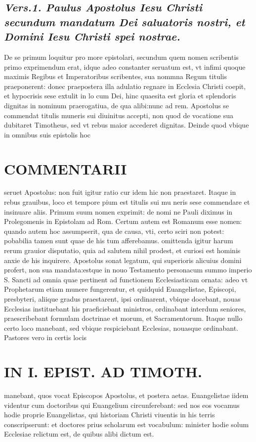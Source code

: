 \documentclass{article}
\begin{document}
\begin{pages}
\subsection*{\textit{Vers.1. Paulus Apostolus Iesu Christi secundum mandatum Dei saluatoris nostri, et Domini Iesu Christi spei nostrae. }}\pstart De se primum loquitur pro more epistolari, secundum quem nomen scribentis primo exprimendum erat, idque adeo constanter seruatum est, vt infimi quoque maximis Regibus et Imperatoribus scribentes, sua nommna Regum titulis praeponerent: donec praepostera illa adulatio regnare in Ecclesia Christi coepit, et hypocrisis sese extulit in lo cum Dei, hinc quaesita est gloria et splendoris dignitas in nominum praerogatiua, de qua alibi:nunc ad rem. Apostolus se commendat titulis muneris sui diuinitus accepti, non quod de vocatione sua dubitaret Timotheus, sed vt rebus maior accederet dignitas. Deinde quod vbique in omnibus suis epistolis hoc  \pend
\section*{COMMENTARII }
\marginpar{[ p.10 ]}\pstart seruet Apostolus: non fuit igitur ratio cur idem hic non praestaret. Itaque in rebus grauibus, loco et tempore pium est titulis sui mu neris sese commendare et insinuare aliis.  \pend\pstart Primum suum nomen exprimit: de nomi ne Pauli diximus in Prolegomenis in Epistolam ad Rom. Certum autem est Romanum esse nomen: quando autem hoc assumpserit, qua de causa, vti, certo sciri non potest: pobabilia tamen sunt quae de his tum afferebamus. omittenda igitur harum rerum grauior disputatio, quia ad salutem nihil prodest, et curiosi est hominis anxie de his inquirere.  \pend\pstart Apostolus sonat legatum, qui superioris alicuius domini profert, non sua mandata:estque in nouo Testamento personacum summo imperio S. Sancti ad omnia quae pertinent ad functionem Ecclesiasticam ornata: adeo vt Prophetarum etiam munere fungerentur, et quidquid Euangelistae, Episcopi, presbyteri, aliique gradus praestarent, ipsi ordinarent, vbique docebant, nouas Ecclesias instituebant his praeficiebant ministros, ordinabant interdum seniores, praescribebant formulam doctrinae et morum, et Sacramentorum. Itaque nullo certo loco manebant, sed vbique respiciebant Ecclesias, nouasque ordinabant. Pastores vero in certis locis  \pend
\section*{IN I. EPIST. AD TIMOTH. }
\marginpar{[ p.11 ]}\pstart manebant, quos vocat Episcopos Apostolus, et postera aetas. Euangelistae iidem videntur cum doctoribus qui Euangelium circunferebant: sed nos eos vocamus hodie proprie Euangelistas, qui historiam Christi viuentis in his terris conscripserunt: et doctores prius scholarum est vocabulum: minister hodie solum Ecclesiae relictum est, de quibus alibi dictum est.  \pend
{}
{}

\end{pages}
\end{document}

